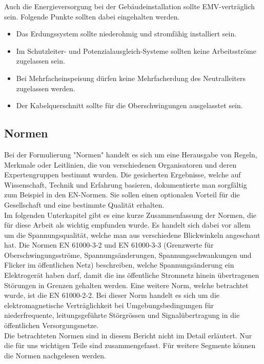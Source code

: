 Auch die Energieversorgung bei der Gebäudeinstallation sollte EMV-verträglich sein. Folgende Punkte sollten dabei eingehalten werden. 

\begin{itemize}
	\item Das Erdungssystem sollte niederohmig und stromfähig installiert sein.
	\item Im Schutzleiter- und Potenzialausgleich-Systeme sollten keine Arbeitsströme zugelassen sein.
	\item Bei Mehrfacheinspeisung dürfen keine Mehrfacherdung des Neutralleiters zugelassen werden.
	\item Der Kabelquerschnitt sollte für die Oberschwingungen ausgelasstet sein.
\end{itemize}  






\subsection{Normen}
Bei der Formulierung "Normen" handelt es sich um eine Herausgabe von Regeln, Merkmale oder Leitlinien, die von verschiedenen Organisatoren und deren Expertengruppen bestimmt wurden. Die gesicherten Ergebnisse, welche auf Wissenschaft, Technik und Erfahrung basieren, dokumentierte man sorgfältig zum Beispiel in den EN-Normen. Sie sollen einen optionalen Vorteil für die Gesellschaft und eine bestimmte Qualität erhalten.\\
Im folgenden Unterkapitel gibt es eine kurze Zusammenfassung der Normen, die für diese Arbeit als wichtig empfunden wurde. Es handelt sich dabei vor allem um die Spannungsqualität, welche man aus verschiedene Blickwinkeln angeschaut hat. Die Normen EN 61000-3-2 und EN 61000-3-3 (Grenzwerte für Oberschwingungsströme, Spannungsänderungen, Spannungsschwankungen und Flicker im öffentlichen Netz) beschreiben, welche Spannungsänderung ein Elektrogerät haben darf, damit die ins öffentliche Stromnetz hinein übertragenen Störungen in Grenzen gehalten werden. Eine weitere Norm, welche betrachtet wurde, ist die EN 61000-2-2. Bei dieser Norm handelt es sich um die elektromagnetische Verträglichkeit bei Umgebungsbedingungen für niederfrequente, leitungsgeführte Störgrössen und Signalübertragung in die öffentlichen Versorgungsnetze.\\
Die betrachteten Normen sind in diesem Bericht nicht im Detail erläutert. Nur die für uns wichtigen Teile sind zusammengefasst. Für weitere Segmente können die Normen nachgelesen werden. 


